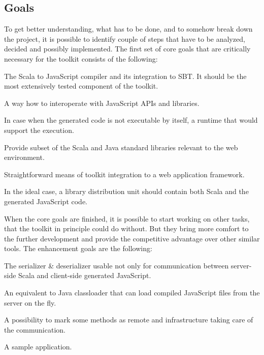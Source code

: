 \documentclass[12pt,a4paper]{report}
\begin{document}
\subsection{Goals}

To get better understanding, what has to be done, and to somehow break down the project, it is possible to identify couple of steps that have to be analyzed, decided and possibly implemented. The first set of core goals that are critically necessary for the toolkit consists of the following:

\begin{description}[style=multiline,leftmargin=5cm]
\item[1 - Compiler] The Scala to JavaScript compiler and its integration to SBT. It should be the most extensively tested component of the toolkit.
\item[2 - Interoperability] A way how to interoperate with JavaScript APIs and libraries.
\item[3 - Runtime] In case when the generated code is not executable by itself, a runtime that would support the execution.
\item[4 - Libraries] Provide subset of the Scala and Java standard libraries relevant to the web environment.
\item[5 - Integration] Straightforward means of toolkit integration to a web application framework.
\item[6 - Distribution] In the ideal case, a library distribution unit should contain both Scala and the generated JavaScript code.
\end{description}

When the core goals are finished, it is possible to start working on other tasks, that the toolkit in principle could do without. But they bring more comfort to the further development and provide the competitive advantage over other similar tools. The enhancement goals are the following:

\begin{description}[style=multiline,leftmargin=5cm]
\item[7 - Serialization] The serializer \& deserializer usable not only for communication between server-side Scala and client-side generated JavaScript.
\item[8 - Loading] An equivalent to Java classloader that can load compiled JavaScript files from the server on the fly.
\item[9 - RPC] A possibility to mark some methods as remote and infrastructure taking care of the communication.
\item[10 - Application] A sample application.
\end{description}
\end{document}
